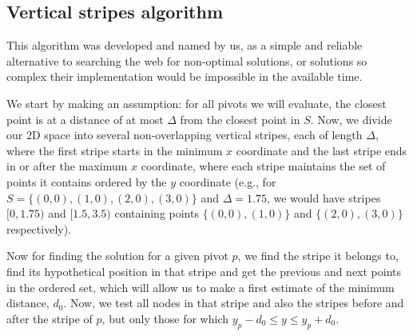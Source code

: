 \subsection{Vertical stripes algorithm} \label{algorithm-vstripes}
This algorithm was developed and named by us, as a simple and reliable alternative to searching the web for non-optimal solutions, or solutions so complex their implementation would be impossible in the available time.\par
We start by making an assumption: for all pivots we will evaluate, the closest point is at a distance of at most $\Delta$ from the closest point in $S$. Now, we divide our 2D space into several non-overlapping vertical stripes, each of length $\Delta$, where the first stripe starts in the minimum $x$ coordinate and the last stripe ends in or after the maximum $x$ coordinate, where each stripe maintains the set of points it contains ordered by the $y$ coordinate (e.g., for $S=\{(0,0),(1,0),(2,0),(3,0)\}$ and $\Delta = 1.75$, we would have stripes $[0,1.75)$ and $[1.5, 3.5)$ containing points $\{(0,0),(1,0)\}$ and $\{(2,0),(3,0)\}$ respectively).\par
Now for finding the solution for a given pivot $p$, we find the stripe it belongs to, find its hypothetical position in that stripe and get the previous and next points in the ordered set, which will allow us to make a first estimate of the minimum distance, $d_0$. Now, we test all nodes in that stripe and also the stripes before and after the stripe of $p$, but only those for which $y_p - d_0 \leq y \leq y_p + d_0$.
